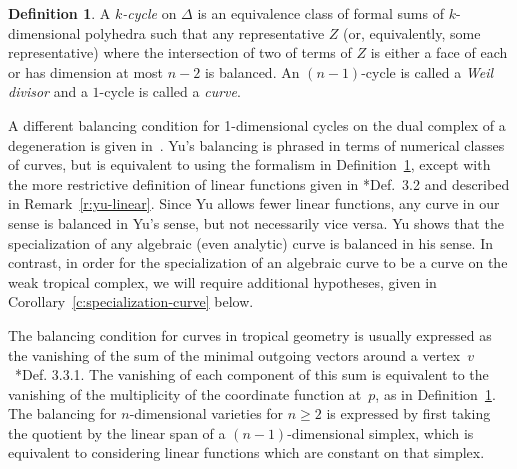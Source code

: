 \documentclass[11pt,reqno]{amsart}
\theoremstyle{definition}
\newtheorem{defn}[thm]{Definition}
\newcommand{\defi}[1]{\emph{#1}}
\begin{document}
\begin{defn}\label{d:cycle}
A \defi{$k$-cycle} on $\Delta$ is an equivalence class of formal sums of
$k$-dimensional polyhedra such that any representative $Z$ (or, equivalently,
some representative) where the intersection of two of terms of $Z$ is either a
face of each or has dimension at most $n-2$ is balanced. An $(n-1)$-cycle is
called a \defi{Weil divisor} and a $1$-cycle is called a \defi{curve}.
\end{defn}

\begin{rmk}\label{r:yu-balancing}
A different balancing condition for 1-dimensional cycles on the dual complex of
a degeneration is given in~\cite{yu-balancing}. Yu's balancing is phrased in
terms of numerical classes of curves, but is equivalent to using the formalism
in Definition~\ref{d:cycle}, except with the more restrictive definition of
linear functions given in \cite{yu-compactness}*{Def.~3.2} and described in
Remark~\ref{r:yu-linear}. Since Yu allows fewer linear functions, any curve in
our sense is balanced in Yu's sense, but not necessarily vice versa.
Yu shows that the specialization of any algebraic (even
analytic) curve is balanced in his sense. In contrast, in order for the
specialization of an algebraic curve to be a curve on the weak tropical complex,
we will require additional hypotheses, given in
Corollary~\ref{c:specialization-curve} below.
\end{rmk}

\begin{rmk}\label{r:tropical-balancing}
The balancing condition for curves in tropical geometry is usually expressed as
the vanishing of the sum of the minimal outgoing vectors around a
vertex~$v$~\cite{maclagan-sturmfels}*{Def. 3.3.1}. The vanishing of each component of
this sum is equivalent to the vanishing of the multiplicity of the coordinate
function at~$p$, as in Definition~\ref{d:cycle}. The balancing for
$n$-dimensional varieties for $n \geq 2$ is expressed by first taking the
quotient by the linear span of a $(n-1)$-dimensional simplex, which is
equivalent to considering linear functions which are constant on that simplex.
\end{rmk}
\end{document}
